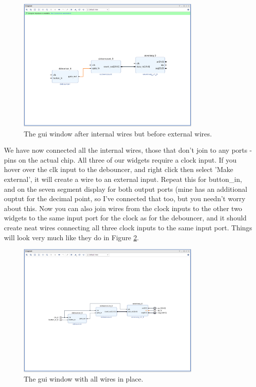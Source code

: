 \documentclass[../physical_computing.tex]{subfiles}
\begin{document}
\begin{figure}[htbp]
    \centering
    \includegraphics[width=0.8\textwidth]{appendix_5/figures/guitwo.png}
    \caption{The gui window after internal wires but before external wires.}
    \label{fig:guitwo}
\end{figure}

We have now connected all the internal wires, those that don't join to any ports - pins on the actual chip. All three of our widgets require a clock input. If you hover over the clk input to the debouncer, and right click then select 'Make external', it will create a wire to an external input. Repeat this for button\_in, and on the seven segment display for both output ports (mine has an additional ouptut for the decimal point, so I've connected that too, but you needn't worry about this. Now you can also join wires from the clock inputs to the other two widgets to the same input port for the clock as for the debouncer, and it should create neat wires connecting all three clock inputs to the same input port. Things will look very much like they do in Figure \ref{fig:guithree}.

\begin{figure}[htbp]
    \centering
    \includegraphics[width=0.8\textwidth]{appendix_5/figures/guithree.png}
    \caption{The gui window with all wires in place.}
    \label{fig:guithree}
\end{figure}
\end{document}
